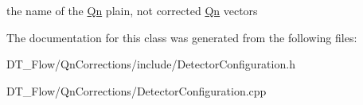 the name of the \mbox{\hyperlink{namespaceQn}{Qn}} plain, not corrected \mbox{\hyperlink{namespaceQn}{Qn}} vectors 

The documentation for this class was generated from the following files\+:\begin{DoxyCompactItemize}
\item 
D\+T\+\_\+\+Flow/\+Qn\+Corrections/include/Detector\+Configuration.\+h\item 
D\+T\+\_\+\+Flow/\+Qn\+Corrections/Detector\+Configuration.\+cpp\end{DoxyCompactItemize}
